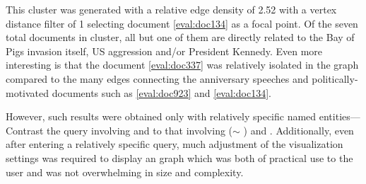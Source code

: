 This cluster was generated with a relative edge density of 2.52 with a vertex distance filter of 1 selecting document \ref{eval:doc134} as a focal point. Of the seven total documents in cluster, all but one of them are directly related to the Bay of Pigs invasion itself, US aggression and/or President Kennedy. Even more interesting is that the document \ref{eval:doc337} was relatively isolated in the graph compared to the many edges connecting the anniversary speeches and politically-motivated documents such as \ref{eval:doc923} and \ref{eval:doc134}.

However, such results were obtained only with relatively specific named entities--- Contrast the query involving  and  to that involving  ($\sim$ )  and . Additionally, even after entering a relatively specific query, much adjustment of the visualization settings was required to display an graph which was both of practical use to the user and was not overwhelming in size and complexity.